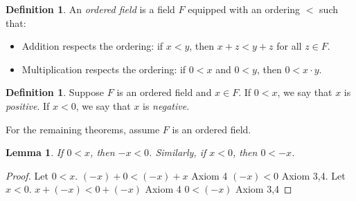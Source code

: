 \documentclass[12pt]{article}
\renewcommand{\_}[1]{\underline{ #1 }}
\newtheorem{lemma}[theorem]{Lemma}
\theoremstyle{definition}
\newtheorem{definition}[theorem]{Definition}
\numberwithin{equation}{subsection}
\begin{document}
\begin{definition}  An \emph{ordered field} is a field $F$ equipped with an ordering $<$ such that:
\begin{itemize}
\item  Addition respects the ordering: if $x < y$, then $x + z < y + z$ for all $z \in F$.
\item  Multiplication respects the ordering: if $0 < x$ and $0 < y$, then $0 < x \cdot y$.
\end{itemize}
\end{definition}

\begin{definition}
Suppose $F$ is an ordered field and $x\in F$.  If $0 < x$, we say that $x$ is 
\emph{positive}.  If $x < 0$, we say that $x$ is \emph{negative}.
\end{definition}

For the remaining theorems, assume $F$ is an ordered field.

\begin{lemma}  If $0 < x$, then $-x < 0$.  Similarly, if $x < 0$, then $0 < -x$.
\end{lemma}

\begin{proof}
Let $0 < x$. \newline
$(-x) + 0 < (-x) + x$ Axiom 4 \newline
$(-x) < 0$ Axiom 3,4. \newline
Let $x < 0$. \newline
$x + (-x) < 0 + (-x)$ Axiom 4 \newline
$0 < (-x)$ Axiom 3,4
\end{proof}
\end{document}
